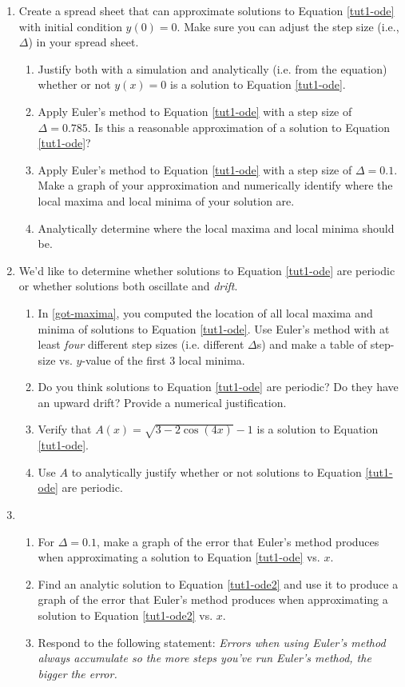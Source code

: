 		\begin{enumerate}
			\item Create a spread sheet that can approximate solutions to Equation \eqref{tut1-ode} with initial condition $y(0)=0$. Make sure you
			can adjust the step size (i.e., $\Delta$) in your spread sheet.
				\begin{enumerate}
					\item Justify both with a simulation and analytically (i.e. from the equation) whether or not $y(x)=0$
					is a solution to Equation \eqref{tut1-ode}.
					\item Apply Euler's method to Equation \eqref{tut1-ode} with a step size of $\Delta=0.785$. Is this a reasonable approximation
					of a solution to Equation \eqref{tut1-ode}?
					\item Apply Euler's method to Equation \eqref{tut1-ode} with a step size of $\Delta=0.1$. Make a graph of your approximation
					and numerically identify where the local maxima and local minima of your solution are.
					\item Analytically determine where the local maxima and
					local minima should be.
					\label{got-maxima}
				\end{enumerate}

			\item We'd like to determine whether solutions to Equation \eqref{tut1-ode} are periodic or whether solutions both oscillate and \emph{drift}.
				\begin{enumerate}
					\item In \ref{got-maxima}, you computed the location of all local maxima and minima of solutions to Equation \eqref{tut1-ode}.
					Use Euler's method with at least \emph{four} different step sizes (i.e. different $\Delta$s) and make a table of step-size vs. 
					$y$-value of the first 3 local minima.
					\item Do you think solutions to Equation \eqref{tut1-ode} are periodic? Do they have an upward drift? Provide a numerical justification.
					\item Verify that $A(x)=\sqrt{3-2\cos(4x)}-1$ is a solution to Equation \eqref{tut1-ode}.
					\item Use $A$ to analytically justify whether or not solutions to Equation \eqref{tut1-ode} are periodic.
				\end{enumerate}

			\item
				\begin{enumerate}
					\item For $\Delta=0.1$, make a graph of the error that Euler's method produces when approximating a solution to Equation \eqref{tut1-ode}
					vs. $x$.
					\item Find an analytic solution to Equation \eqref{tut1-ode2} and use it to produce a graph of the error that Euler's method
					produces when approximating a solution to Equation \eqref{tut1-ode2} vs. $x$.
					\item Respond to the following statement: \emph{Errors when using Euler's method always accumulate so the more steps you've run
					Euler's method, the bigger the error.}
				\end{enumerate}

		\end{enumerate}

